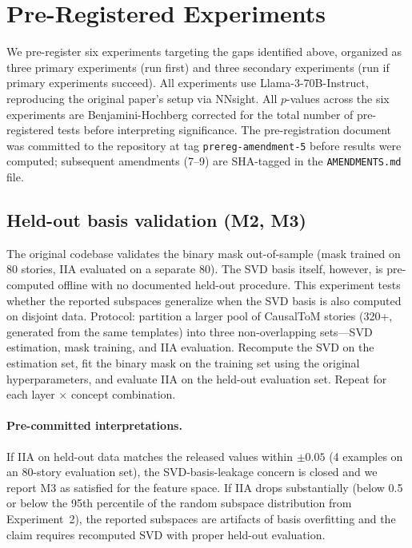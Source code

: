 \documentclass[11pt]{article}
\begin{document}
\section{Pre-Registered Experiments}
\label{sec:experiments}

We pre-register six experiments targeting the gaps identified above, organized as three primary experiments (run first) and three secondary experiments (run if primary experiments succeed). All experiments use Llama-3-70B-Instruct, reproducing the original paper's setup via NNsight. All $p$-values across the six experiments are Benjamini-Hochberg corrected for the total number of pre-registered tests before interpreting significance. The pre-registration document was committed to the repository at tag \texttt{prereg-amendment-5} before results were computed; subsequent amendments (7--9) are SHA-tagged in the \texttt{AMENDMENTS.md} file.

\subsection{Held-out basis validation (M2, M3)}

The original codebase validates the binary mask out-of-sample (mask trained on 80 stories, IIA evaluated on a separate 80). The SVD basis itself, however, is pre-computed offline with no documented held-out procedure. This experiment tests whether the reported subspaces generalize when the SVD basis is also computed on disjoint data. Protocol: partition a larger pool of CausalToM stories (320+, generated from the same templates) into three non-overlapping sets---SVD estimation, mask training, and IIA evaluation. Recompute the SVD on the estimation set, fit the binary mask on the training set using the original hyperparameters, and evaluate IIA on the held-out evaluation set. Repeat for each layer $\times$ concept combination.

\paragraph{Pre-committed interpretations.} If IIA on held-out data matches the released values within $\pm 0.05$ (4 examples on an 80-story evaluation set), the SVD-basis-leakage concern is closed and we report M3 as satisfied for the feature space. If IIA drops substantially (below 0.5 or below the 95th percentile of the random subspace distribution from Experiment~2), the reported subspaces are artifacts of basis overfitting and the claim requires recomputed SVD with proper held-out evaluation.
\end{document}
